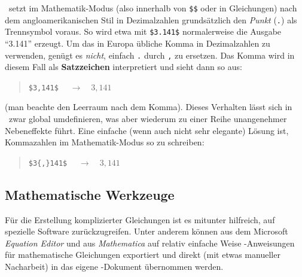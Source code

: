 \latex\ setzt im Mathematik-Modus (also innerhalb von \verb!$$! oder in Gleichungen) nach dem angloamerikanischen Stil in Dezimalzahlen grundsätzlich den \emph{Punkt} (\verb!.!) als Trennsymbol voraus. So wird etwa mit \verb!$3.141$! normalerweise die Ausgabe "`3.141"' erzeugt. Um das in Europa übliche Komma in Dezimalzahlen zu verwenden, genügt es \emph{nicht}, einfach \verb!.! durch \verb!,! zu ersetzen. Das Komma wird in diesem Fall
als \textbf{Satzzeichen} interpretiert und sieht dann so aus:
\begin{quote}
\verb!$3,141$!	$\quad \rightarrow \quad 3,141$ 
\end{quote}
(man beachte den Leerraum nach dem Komma). Dieses Verhalten lässt sich in \latex\ zwar global umdefinieren, was aber wiederum zu einer Reihe unangenehmer Nebeneffekte führt. Eine einfache (wenn auch nicht sehr elegante) Lösung ist, Kommazahlen im Mathematik-Modus so zu schreiben:
\begin{quote}
\verb!$3{,}141$!	$\quad \rightarrow \quad 3{,}141$
\end{quote}



\subsection{Mathematische Werkzeuge}

Für die Erstellung komplizierter Gleichungen ist es mitunter
hilfreich, auf spezielle Software zurückzugreifen. Unter anderem können
aus dem Microsoft \emph{Equation Editor} und aus {\em
Mathematica} auf relativ einfache Weise \latex-An\-wei\-sun\-gen
für mathematische Gleichungen exportiert und direkt (mit etwas
manueller Nacharbeit) in das eigene \latex-Dokument übernommen werden.



